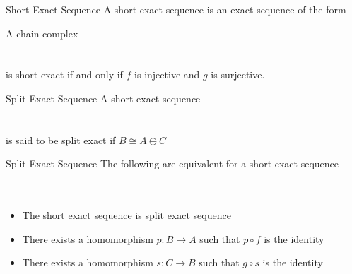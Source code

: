\documentclass[a4paper]{article}
\begin{document}
\begin{defn}{Short Exact Sequence}{} A short exact sequence is an exact sequence of the form \\
\end{defn}

\begin{prp}{}{} A chain complex \\
\\~\\
is short exact if and only if $f$ is injective and $g$ is surjective. 
\end{prp}

\begin{defn}{Split Exact Sequence}{} A short exact sequence \\
\\~\\
is said to be split exact if $B\cong A\oplus C$
\end{defn}

\begin{prp}{Split Exact Sequence}{} The following are equivalent for a short exact sequence \\
\\~\\
\begin{itemize}
\item The short exact sequence is split exact sequence
\item There exists a homomorphism $p:B\to A$ such that $p\circ f$ is the identity
\item There exists a homomorphism $s:C\to B$ such that $g\circ s$ is the identity
\end{itemize}
\end{prp}
\end{document}
